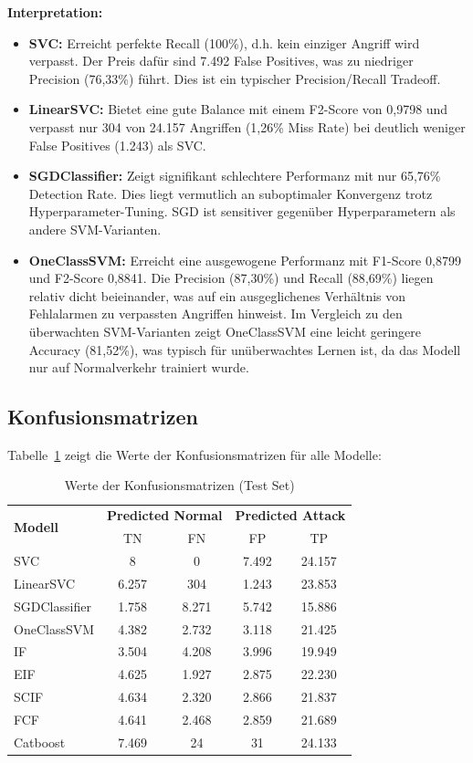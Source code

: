 \documentclass[12pt,oneside]{article}
\begin{document}
	\textbf{Interpretation:}
	\begin{itemize}
		\item \textbf{SVC:} Erreicht perfekte Recall (100\%), d.h. kein einziger Angriff wird verpasst. Der Preis dafür sind 7.492 False Positives, was zu niedriger Precision (76{,}33\%) führt. Dies ist ein typischer Precision/Recall Tradeoff.
		\item \textbf{LinearSVC:} Bietet eine gute Balance mit einem F2-Score von 0,9798 und verpasst nur 304 von 24.157 Angriffen (1{,}26\% Miss Rate) bei deutlich weniger False Positives (1.243) als SVC. 
		\item \textbf{SGDClassifier:} Zeigt signifikant schlechtere Performanz mit nur 65,76\% Detection Rate. Dies liegt vermutlich an suboptimaler Konvergenz trotz Hyperparameter-Tuning. SGD ist sensitiver gegenüber Hyperparametern als andere SVM-Varianten.
		\item \textbf{OneClassSVM:} Erreicht eine ausgewogene Performanz mit F1-Score 0,8799 und F2-Score 0,8841. Die Precision (87{,}30\%) und Recall (88{,}69\%) liegen relativ dicht beieinander, was auf ein ausgeglichenes Verhältnis von Fehlalarmen zu verpassten Angriffen hinweist. Im Vergleich zu den überwachten SVM-Varianten zeigt OneClassSVM eine leicht geringere Accuracy (81{,}52\%), was typisch für unüberwachtes Lernen ist, da das Modell nur auf Normalverkehr trainiert wurde.

	\end{itemize}
	\subsection{Konfusionsmatrizen}
	Tabelle~\ref{tab:confusion} zeigt die Werte der Konfusionsmatrizen für alle Modelle:
	\begin{table}[h]
		\centering
		\caption{Werte der Konfusionsmatrizen (Test Set)}
		\label{tab:confusion}
		\begin{tabular}{lcccc}
			\toprule
			\multirow{2}{*}{\textbf{Modell}} & \multicolumn{2}{c}{\textbf{Predicted Normal}} & \multicolumn{2}{c}{\textbf{Predicted Attack}} \\
			& TN & FN & FP & TP \\
			\midrule
			SVC           & 8     & 0     & 7.492 & 24.157 \\
			LinearSVC     & 6.257 & 304   & 1.243 & 23.853 \\
			SGDClassifier & 1.758 & 8.271 & 5.742 & 15.886 \\
			OneClassSVM   & 4.382 & 2.732 & 3.118 & 21.425 \\
			IF	 		  & 3.504 & 4.208 & 3.996 & 19.949 \\
			EIF	 		  & 4.625 & 1.927 & 2.875 & 22.230 \\
			SCIF	 	  & 4.634 & 2.320 & 2.866 & 21.837 \\
			FCF	 		  & 4.641 & 2.468 & 2.859 & 21.689 \\
			Catboost	  & 7.469 & 24	  &    31 & 24.133 \\
			\bottomrule
		\end{tabular}
	\end{table}
	
\end{document}
